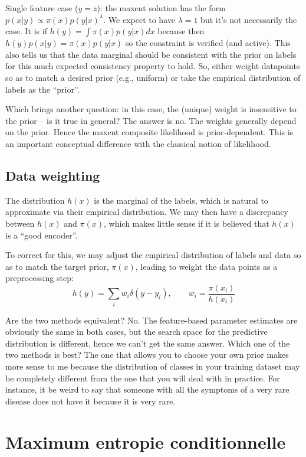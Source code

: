 \documentclass[english]{scrartcl}
\begin{document}
Single feature case ($y=z$): the maxent solution has the form $p(x|y)\propto\pi(x)p(y|x)^\lambda$. We expect to have $\lambda=1$ but it's not necessarily the case. It is if $h(y)=\int\pi(x)p(y|x)dx$ because then $h(y)p(x|y)=\pi(x)p(y|x)$ so the constraint is verified (and active). This also tells us that the data marginal should be consistent with the prior on labels for this much expected consistency property to hold. So, either weight datapoints so as to match a desired prior (e.g., uniform) or take the empirical distribution of labels as the ``prior''. 

Which brings another question: in this case, the (unique) weight is insensitive to the prior -- is it true in general? The answer is no. The weights generally depend on the prior. Hence the maxent composite likelihood is prior-dependent. This is an important conceptual difference with the classical notion of likelihood.




\subsection{Data weighting}

The distribution $h(x)$ is the marginal of the labels, which is natural to approximate via their empirical distribution. We may then have a discrepancy between $h(x)$ and $\pi(x)$, which makes little sense if it is believed that $h(x)$ is a ``good encoder''. 

To correct for this, we may adjust the empirical distribution of labels and data so as to match the target prior, $\pi(x)$, leading to weight the data points as a preprocessing step:
$$
h(y) = \sum_i w_i \delta(y-y_i),
\qquad
w_i = \frac{\pi(x_i)}{h(x_i)}
$$

Are the two methods equivalent? No. The feature-based parameter estimates are obviously the same in both cases, but the search space for the predictive distribution is different, hence we can't get the same answer. Which one of the two methods is best? The one that allows you to choose your own prior makes more sense to me because the distribution of classes in your training dataset may be completely different from the one that you will deal with in practice. For instance, it be weird to say that someone with all the symptoms of a very rare disease does not have it because it is very rare. 


\section{Maximum entropie conditionnelle}
\end{document}
